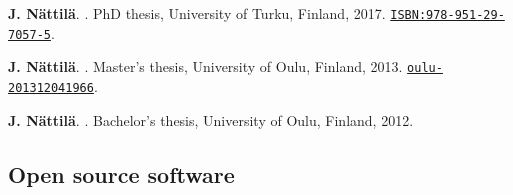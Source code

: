 \documentclass[10pt]{article}
\begin{document}
\vspace{-20pt}
%
\begin{thebibliography}{3}
\vspace{-5pt}

\textbf{J. N\"attil\"a}.
.
\newblock PhD thesis, University of Turku, Finland, 2017. \href{http://urn.fi/URN:ISBN:978-951-29-7057-5}{\nolinkurl{ISBN:978-951-29-7057-5}}.

\textbf{J. N\"attil\"a}.
.
\newblock Master's thesis, University of Oulu, Finland, 2013. \href{http://urn.fi/URN:NBN:fi:oulu-201312041966}{\nolinkurl{oulu-201312041966}}.

\textbf{J. N\"attil\"a}.
.
\newblock Bachelor's thesis, University of Oulu, Finland, 2012.

\end{thebibliography}

\vspace{-5pt}
\subsection*{\phantom{sub} Open source software}
\end{document}
